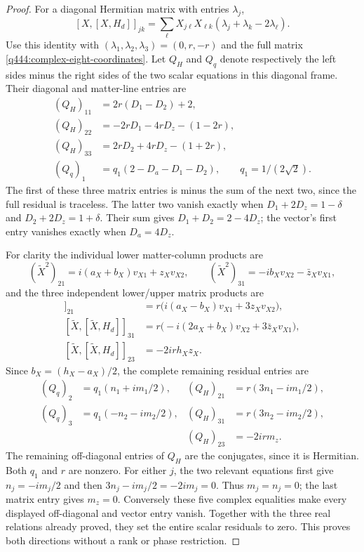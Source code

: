 \begin{proof}
For a diagonal Hermitian matrix with entries $\lambda_j$,
\[
[X,[X,H_d]]_{jk}
=\sum_\ell X_{j\ell}X_{\ell k}
(\lambda_j+\lambda_k-2\lambda_\ell).
\]
Use this identity with $(\lambda_1,\lambda_2,\lambda_3)=(0,r,-r)$
and the full matrix \eqref{q444:complex-eight-coordinates}.
Let $Q_H$ and $Q_q$ denote respectively the left sides minus the right
sides of the two scalar equations in this diagonal frame. Their
diagonal and matter-line entries are
\begin{align*}
(Q_H)_{11}&=2r(D_1-D_2)+2,\\
(Q_H)_{22}&=-2rD_1-4rD_z-(1-2r),\\
(Q_H)_{33}&=2rD_2+4rD_z-(1+2r),\\
(Q_q)_1&=q_1(2-D_a-D_1-D_2),\qquad q_1=1/(2\sqrt2).
\end{align*}
The first of these three matrix entries is minus the sum of the next
two, since the full residual is traceless. The latter two vanish
exactly when $D_1+2D_z=1-\delta$ and $D_2+2D_z=1+\delta$.
Their sum gives $D_1+D_2=2-4D_z$; the vector's first entry vanishes
exactly when $D_a=4D_z$.

For clarity the individual lower matter-column products are
\[
(\widetilde X^2)_{21}=i(a_X+b_X)v_{X1}+z_Xv_{X2},\qquad
(\widetilde X^2)_{31}=-ib_Xv_{X2}-\bar z_Xv_{X1},
\]
and the three independent lower/upper matrix products are
\begin{align*}
[\widetilde X,[\widetilde X,H_d]]_{21}
&=r\bigl(i(a_X-b_X)v_{X1}+3z_Xv_{X2}\bigr),\\
[\widetilde X,[\widetilde X,H_d]]_{31}
&=r\bigl(-i(2a_X+b_X)v_{X2}+3\bar z_Xv_{X1}\bigr),\\
[\widetilde X,[\widetilde X,H_d]]_{23}
&=-2ir h_Xz_X.
\end{align*}
Since $b_X=(h_X-a_X)/2$, the complete remaining residual entries are
\begin{align*}
(Q_q)_2&=q_1(n_1+im_1/2),&
(Q_H)_{21}&=r(3n_1-im_1/2),\\
(Q_q)_3&=q_1(-n_2-im_2/2),&
(Q_H)_{31}&=r(3n_2-im_2/2),\\
&& (Q_H)_{23}&=-2ir m_z.
\end{align*}
The remaining off-diagonal entries of $Q_H$ are the conjugates, since
it is Hermitian. Both $q_1$ and $r$ are nonzero. For either $j$, the
two relevant equations first give $n_j=-im_j/2$ and then
$3n_j-im_j/2=-2im_j=0$. Thus $m_j=n_j=0$; the last matrix entry gives
$m_z=0$. Conversely these five complex equalities make every displayed
off-diagonal and vector entry vanish. Together with the three real
relations already proved, they set the entire scalar residuals to
zero. This proves both directions without a rank or phase restriction.
\end{proof}

